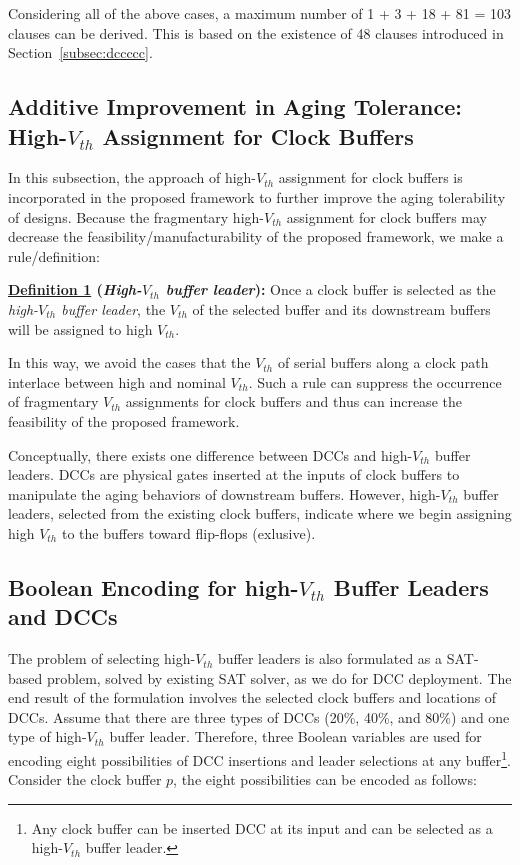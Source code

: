 Considering all of the above cases, a maximum number of 1 + 3 + 18 + 81 = 103 clauses can be derived. This is based on the existence of 48 clauses introduced in Section~\ref{subsec:dccccc}.


\subsection{Additive Improvement in Aging Tolerance: High-$V_{th}$ Assignment for Clock Buffers}
\label{sec:VTA}
In this subsection, the approach of high-$V_{th}$ assignment for clock buffers is incorporated in the proposed framework to further improve the aging tolerability of designs. Because the fragmentary high-$V_{th}$ assignment for clock buffers may decrease the feasibility/manufacturability of the proposed framework, we make a rule/definition:

\noindent \textbf{\uline{Definition 1} (\textit{High-$V_{th}$ buffer leader}):} Once a clock buffer is selected as the \textit{high-$V_{th}$ buffer leader}, the $V_{th}$ of the selected buffer and its downstream buffers will be assigned to high $V_{th}$.

In this way, we avoid the cases that the $V_{th}$ of serial buffers along a clock path interlace between high and nominal $V_{th}$. Such a rule can suppress the occurrence of fragmentary $V_{th}$ assignments for clock buffers and thus can increase the feasibility of the proposed framework.

Conceptually, there exists one difference between DCCs and high-$V_{th}$ buffer leaders. DCCs are physical gates inserted at the inputs of clock buffers to manipulate the aging behaviors of downstream buffers. However, high-$V_{th}$ buffer leaders, selected from the existing clock buffers, indicate where we begin assigning high $V_{th}$ to the buffers toward flip-flops (exlusive).

\subsection{Boolean Encoding for high-$V_{th}$ Buffer Leaders and DCCs}
The problem of selecting high-$V_{th}$ buffer leaders is also formulated as a SAT-based problem, solved by existing SAT solver, as we do for DCC deployment. The end result of the formulation involves the selected clock buffers and locations of DCCs. Assume that there are three types of DCCs (20\%, 40\%, and 80\%) and one type of high-$V_{th}$ buffer leader. Therefore, three Boolean variables are used for encoding eight possibilities of DCC insertions and leader selections at any buffer\footnote{Any clock buffer can be inserted DCC at its input and can be selected as a high-$V_{th}$ buffer leader.}. Consider the clock buffer $p$, the eight possibilities can be encoded as follows:


